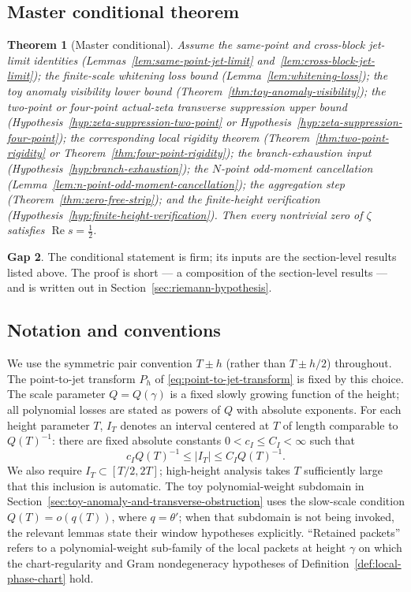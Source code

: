 \documentclass[11pt,a4paper]{amsart}
\numberwithin{equation}{section}
\theoremstyle{plain}
\newtheorem{theorem}{Theorem}[section]
\theoremstyle{definition}
\newcommand{\RePart}{\operatorname{Re}}
\newtheorem{wip}[theorem]{Gap}
\begin{document}
\subsection{Master conditional theorem}
\label{subsec:master-conditional}

\begin{theorem}[Master conditional]
\label{thm:master-conditional}
Assume the same-point and cross-block jet-limit identities
(Lemmas~\ref{lem:same-point-jet-limit}
and~\ref{lem:cross-block-jet-limit}); the finite-scale whitening loss
bound (Lemma~\ref{lem:whitening-loss}); the toy anomaly visibility lower
bound (Theorem~\ref{thm:toy-anomaly-visibility}); the two-point or
four-point actual-zeta transverse suppression upper bound
(Hypothesis~\ref{hyp:zeta-suppression-two-point} or
Hypothesis~\ref{hyp:zeta-suppression-four-point}); the corresponding
local rigidity theorem (Theorem~\ref{thm:two-point-rigidity} or
Theorem~\ref{thm:four-point-rigidity}); the branch-exhaustion input
(Hypothesis~\ref{hyp:branch-exhaustion}); the \(N\)-point odd-moment
cancellation (Lemma~\ref{lem:n-point-odd-moment-cancellation}); the
aggregation step (Theorem~\ref{thm:zero-free-strip}); and the
finite-height verification
(Hypothesis~\ref{hyp:finite-height-verification}).  Then every
nontrivial zero of \(\zeta\) satisfies \(\RePart s = \tfrac12\).
\end{theorem}

\begin{wip}\label{rem:wip-master-conditional}
The conditional statement is firm; its inputs are the section-level
results listed above.  The proof is short --- a composition of the
section-level results --- and is written out in
Section~\ref{sec:riemann-hypothesis}.
\end{wip}

\subsection{Notation and conventions}
\label{subsec:notation-and-conventions}

We use the symmetric pair convention \(T\pm h\) (rather than \(T\pm h/2\))
throughout.  The point-to-jet transform \(P_h\) of
\eqref{eq:point-to-jet-transform} is fixed by this choice.  The scale
parameter \(Q=Q(\gamma)\) is a fixed slowly growing function of the
height; all polynomial losses are stated as powers of \(Q\) with absolute
exponents.  For each height parameter \(T\), \(I_T\) denotes an
interval centered at \(T\) of length comparable to \(Q(T)^{-1}\):
there are fixed absolute constants \(0<c_I\le C_I<\infty\) such that
\[
        c_I Q(T)^{-1}\le |I_T|\le C_I Q(T)^{-1}.
\]
We also require \(I_T\subset[T/2,2T]\); high-height analysis takes
\(T\) sufficiently large that this inclusion is automatic.  The toy
polynomial-weight subdomain in
Section~\ref{sec:toy-anomaly-and-transverse-obstruction} uses the
slow-scale condition \(Q(T)=o(q(T))\), where \(q=\theta'\); when that
subdomain is not being invoked, the relevant lemmas state their window
hypotheses explicitly.  ``Retained packets'' refers to a polynomial-weight
sub-family of the local packets at height \(\gamma\) on which the
chart-regularity and Gram nondegeneracy hypotheses of
Definition~\ref{def:local-phase-chart} hold.
\end{document}

